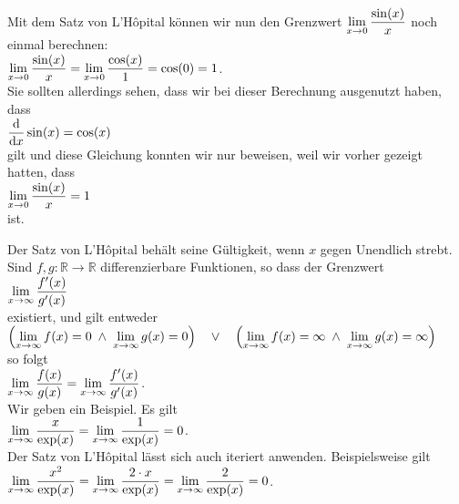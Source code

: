 \example
Mit dem Satz von L'H\^opital k\"onnen wir nun den Grenzwert
$\displaystyle\lim\limits_{x \rightarrow 0} \frac{\sin(x)}{x}$ noch einmal berechnen: 
\\[0.1cm]
\hspace*{1.3cm} $\displaystyle\lim\limits_{x \rightarrow 0} \frac{\sin(x)}{x} = \lim\limits_{x \rightarrow 0}
\frac{\cos(x)}{1} = \cos(0) = 1$.
\\[0.2cm]
Sie sollten allerdings sehen, dass wir bei dieser Berechnung ausgenutzt haben, dass
\\[0.2cm]
\hspace*{1.3cm}
$\displaystyle\frac{\textrm{d}}{\textrm{d}x}\sin(x) = \cos(x)$
\\[0.2cm]
gilt und diese Gleichung konnten wir nur beweisen, weil wir vorher gezeigt hatten, dass
\\[0.2cm]
\hspace*{1.3cm}
$\displaystyle\lim\limits_{x \rightarrow 0} \frac{\sin(x)}{x} = 1$
\\[0.2cm]
ist.
\eox

\remark
Der Satz von L'H\^opital beh\"alt seine G\"ultigkeit, wenn $x$ gegen Unendlich strebt.  Sind 
$f,g:\mathbb{R} \rightarrow \mathbb{R}$ differenzierbare Funktionen, so dass der Grenzwert
\\[0.3cm]
\hspace*{1.3cm}
$\displaystyle\lim\limits_{x \rightarrow \infty} \frac{f'(x)}{g'(x)}$ 
\\[0.3cm]
existiert, und gilt entweder 
\\[0.3cm]
\hspace*{0.3cm}
$\Bigl(\lim\limits_{x \rightarrow \infty} f(x) = 0 \;\wedge\; \lim\limits_{x \rightarrow \infty} g(x) = 0\Bigr) \quad \vee \quad
 \Bigl(\lim\limits_{x \rightarrow \infty} f(x) = \infty \;\wedge\;\lim\limits_{x \rightarrow \infty} g(x) = \infty\Bigr)$ 
\\[0.3cm]
so folgt
\\
\hspace*{1.3cm}
$\displaystyle\lim\limits_{x \rightarrow \infty} \frac{f(x)}{g(x)} = \lim\limits_{x \rightarrow \infty} \frac{f'(x)}{g'(x)}$.
\\[0.3cm]
Wir geben ein Beispiel.  Es gilt 
\\[0.3cm]
\hspace*{1.3cm}
$\displaystyle\lim\limits_{x \rightarrow \infty} \frac{x}{\exp(x)} = \lim\limits_{x \rightarrow \infty} \frac{1}{\exp(x)} = 0$.
\\[0.3cm]
Der Satz von L'H\^opital l\"asst sich auch iteriert anwenden.  Beispielsweise gilt
\\[0.3cm]
\hspace*{1.3cm}
$\displaystyle\lim\limits_{x \rightarrow \infty} \frac{x^2}{\exp(x)} = \lim\limits_{x \rightarrow \infty}
\frac{2\cdot x}{\exp(x)} =\lim\limits_{x \rightarrow \infty} \frac{2}{\exp(x)} = 0$. \eox

